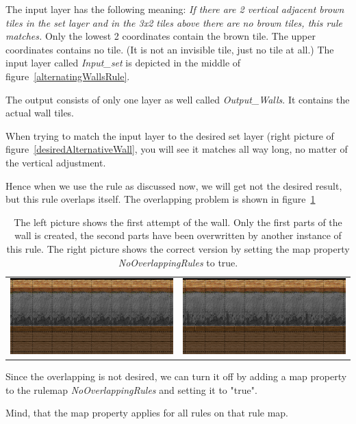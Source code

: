 The input layer has the following meaning: \emph{If there are 2 vertical adjacent brown tiles in the set layer
and in the 3x2 tiles above there are no brown tiles, this rule matches.}
Only the lowest 2 coordinates contain the brown tile. The upper coordinates contains no tile. 
(It is not an invisible tile, just no tile at all.)
The input layer called \emph{Input\_set} is depicted in the middle of 
figure~\ref{alternatingWallsRule}. 

The output consists of only one layer as well called \emph{Output\_Walls}.
It contains the actual wall tiles.

When trying to match the input layer to the desired set layer (right picture of figure~\ref{desiredAlternativeWall},
you will see it matches all way long, no matter of the vertical adjustment.

Hence when we use the rule as discussed now, we will get not the desired result, but this rule
overlaps itself. The overlapping problem is shown in figure~\ref{problemAlternativeWall}

\begin{table}
	\begin{tabular}{c c}
	\includegraphics[scale=0.5]{Example/LoneCoder/alternatingwalls/firstattempt.eps} &
	\includegraphics[scale=0.5]{Example/LoneCoder/alternatingwalls/desired.eps} \\
	\end{tabular}
  \caption{The left picture shows the first attempt of the wall. Only the first parts of the wall is created, 
  the second parts have been overwritten by another instance of this rule.
  The right picture shows the correct version by setting the map property \emph{NoOverlappingRules} to true.}
  \label{problemAlternativeWall}
\end{table}

Since the overlapping is not desired, we can turn it off by adding a map property to the rulemap
\emph{NoOverlappingRules} and setting it to "true".

Mind, that the map property applies for all rules on that rule map.



